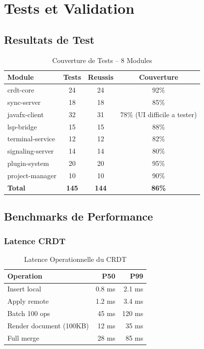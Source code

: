 \documentclass[11pt,a4paper,hidelinks]{book}
\begin{document}
\section{Tests et Validation}

\subsection{Resultats de Test}

\begin{table}[H]
\centering
\caption{Couverture de Tests -- 8 Modules}
\begin{tabularx}{\textwidth}{l c c c}
\toprule
\textbf{Module} & \textbf{Tests} & \textbf{Reussis} & \textbf{Couverture} \\
\midrule
crdt-core & 24 & 24 & 92\% \\
sync-server & 18 & 18 & 85\% \\
javafx-client & 32 & 31 & 78\% (UI difficile a tester) \\
lsp-bridge & 15 & 15 & 88\% \\
terminal-service & 12 & 12 & 82\% \\
signaling-server & 14 & 14 & 80\% \\
plugin-system & 20 & 20 & 95\% \\
project-manager & 10 & 10 & 90\% \\
\midrule
\textbf{Total} & \textbf{145} & \textbf{144} & \textbf{86\%} \\
\bottomrule
\end{tabularx}
\end{table}

\subsection{Benchmarks de Performance}

\subsubsection{Latence CRDT}

\begin{table}[H]
\centering
\caption{Latence Operationnelle du CRDT}
\begin{tabularx}{\textwidth}{l r r}
\toprule
\textbf{Operation} & \textbf{P50} & \textbf{P99} \\
\midrule
Insert local & 0.8 ms & 2.1 ms \\
Apply remote & 1.2 ms & 3.4 ms \\
Batch 100 ops & 45 ms & 120 ms \\
Render document (100KB) & 12 ms & 35 ms \\
Full merge & 28 ms & 85 ms \\
\bottomrule
\end{tabularx}
\end{table}
\end{document}
